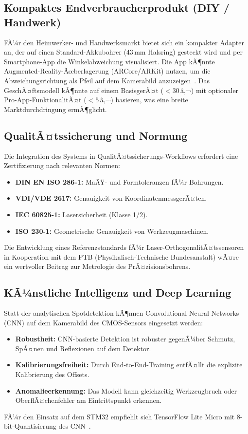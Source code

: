 ﻿\documentclass[a4paper,12pt]{article}
\theoremstyle{definition}
\begin{document}
\subsection{Kompaktes Endverbraucherprodukt (DIY / Handwerk)}

FÃ¼r den Heimwerker- und Handwerksmarkt bietet sich ein kompakter Adapter an,
der auf einen Standard-Akkubohrer ($43\,\mathrm{mm}$ Halsring) gesteckt wird
und per Smartphone-App die Winkelabweichung visualisiert.
Die App kÃ¶nnte Augmented-Reality-Ãœberlagerung (ARCore/ARKit) nutzen, um
die Abweichungsrichtung als Pfeil auf dem Kamerabild anzuzeigen~\cite{azuma1997survey}.
Das GeschÃ¤ftsmodell kÃ¶nnte auf einem BasisgerÃ¤t ($< 30\,$â‚¬) mit optionaler
Pro-App-FunktionalitÃ¤t ($< 5\,$â‚¬) basieren, was eine breite Marktdurchdringung
ermÃ¶glicht.

\subsection{QualitÃ¤tssicherung und Normung}

Die Integration des Systems in QualitÃ¤tssicherungs-Workflows erfordert eine
Zertifizierung nach relevanten Normen:
\begin{itemize}
  \item \textbf{DIN EN ISO 286-1:} MaÃŸ- und Formtoleranzen fÃ¼r Bohrungen.
  \item \textbf{VDI/VDE 2617:} Genauigkeit von KoordinatenmessgerÃ¤ten.
  \item \textbf{IEC 60825-1:} Lasersicherheit (Klasse 1/2).
  \item \textbf{ISO 230-1:} Geometrische Genauigkeit von Werkzeugmaschinen.
\end{itemize}
Die Entwicklung eines Referenzstandards fÃ¼r Laser-OrthogonalitÃ¤tssensoren
in Kooperation mit dem PTB (Physikalisch-Technische Bundesanstalt) wÃ¤re
ein wertvoller Beitrag zur Metrologie des PrÃ¤zisionsbohrens.

\subsection{KÃ¼nstliche Intelligenz und Deep Learning}

Statt der analytischen Spotdetektion kÃ¶nnen Convolutional Neural Networks (CNN)
auf dem Kamerabild des CMOS-Sensors eingesetzt werden:
\begin{itemize}
  \item \textbf{Robustheit:} CNN-basierte Detektion ist robuster gegenÃ¼ber
    Schmutz, SpÃ¤nen und Reflexionen auf dem Detektor.
  \item \textbf{Kalibrierungsfreiheit:} Durch End-to-End-Training entfÃ¤llt
    die explizite Kalibrierung des Offsets.
  \item \textbf{Anomalieerkennung:} Das Modell kann gleichzeitig
    Werkzeugbruch oder OberflÃ¤chenfehler am Eintrittspunkt erkennen.
\end{itemize}
FÃ¼r den Einsatz auf dem STM32 empfiehlt sich TensorFlow Lite Micro mit
8-bit-Quantisierung des CNN~\cite{warden2019tinyml}.
\end{document}
